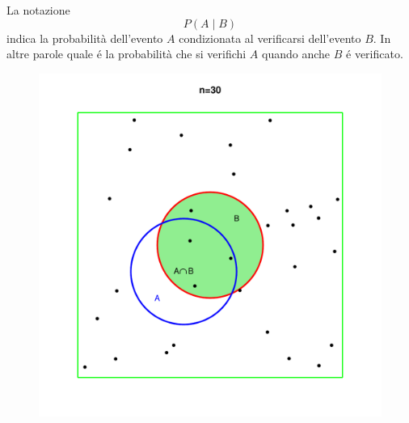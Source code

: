 \documentclass[onecolumn,12pt]{book}\usepackage[]{graphicx}\usepackage[]{color}
\makeatletter
\def\maxwidth{ %
  \ifdim\Gin@nat@width>\linewidth
    \linewidth
  \else
    \Gin@nat@width
  \fi
}
\newenvironment{kframe}{%
 \def\at@end@of@kframe{}%
 \ifinner\ifhmode%
  \def\at@end@of@kframe{\end{minipage}}%
  \begin{minipage}{\columnwidth}%
 \fi\fi%
 \def\FrameCommand##1{\hskip\@totalleftmargin \hskip-\fboxsep
 \colorbox{shadecolor}{##1}\hskip-\fboxsep
     \hskip-\linewidth \hskip-\@totalleftmargin \hskip\columnwidth}%
 \MakeFramed {\advance\hsize-\width
   \@totalleftmargin\z@ \linewidth\hsize
   \@setminipage}}%
 {\par\unskip\endMakeFramed%
 \at@end@of@kframe}
\newenvironment{knitrout}{}{} %
\makeatother
\begin{document}
La notazione 
\[P(A\mid B)\]
indica la probabilità  dell'evento $A$ condizionata al verificarsi dell'evento $B$.
In altre parole quale é la probabilità che si verifichi $A$ quando anche $B$ é verificato. 
 \begin{center}
\begin{figure}
\begin{knitrout}
\color{fgcolor}
\includegraphics[width=\maxwidth]{figure/unnamed-chunk-6-1} 

\end{knitrout}

\end{figure}
\end{center}
\begin{knitrout}
\color{fgcolor}\begin{kframe}


{\ttfamily\noindent\itshape\color{messagecolor}{\#\# \\\#\# Attaching package: 'MASS'}}

{\ttfamily\noindent\itshape\color{messagecolor}{\#\# The following object is masked from 'package:EsamiR':\\\#\# \\\#\#\ \ \ \  crabs}}\end{kframe}
\end{knitrout}
\end{document}
